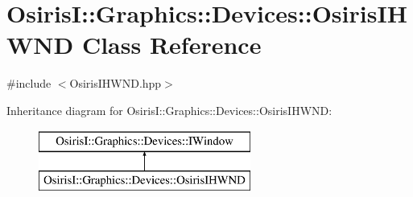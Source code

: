\hypertarget{class_osiris_i_1_1_graphics_1_1_devices_1_1_osiris_i_h_w_n_d}{\section{Osiris\-I\-:\-:Graphics\-:\-:Devices\-:\-:Osiris\-I\-H\-W\-N\-D Class Reference}
\label{class_osiris_i_1_1_graphics_1_1_devices_1_1_osiris_i_h_w_n_d}
}


{\ttfamily \#include $<$Osiris\-I\-H\-W\-N\-D.\-hpp$>$}

Inheritance diagram for Osiris\-I\-:\-:Graphics\-:\-:Devices\-:\-:Osiris\-I\-H\-W\-N\-D\-:\begin{figure}[H]
\begin{center}
\leavevmode
\includegraphics[height=2.000000cm]{class_osiris_i_1_1_graphics_1_1_devices_1_1_osiris_i_h_w_n_d}
\end{center}
\end{figure}

